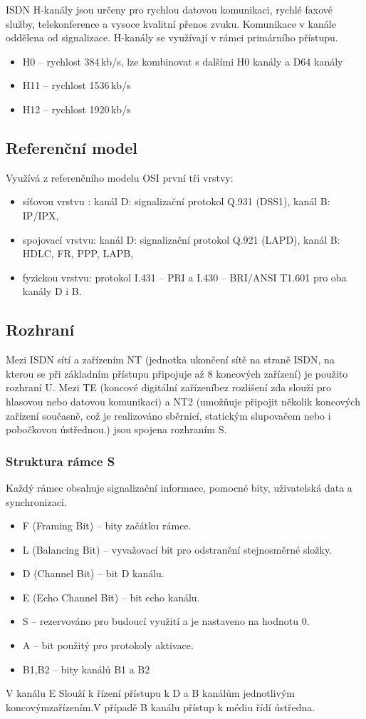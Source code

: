 ISDN H-kanály jsou určeny pro rychlou datovou komunikaci, rychlé faxové služby, telekonference a vysoce kvalitní přenos zvuku. Komunikace v kanále oddělena od signalizace. H-kanály se využívají v rámci primárního přístupu.
\begin{itemize}
    \item H0 -- rychlost 384\,kb/s, lze kombinovat s dalšími H0 kanály a D64 kanály
    \item H11 -- rychlost 1536\,kb/s
    \item H12 -- rychlost 1920\,kb/s
\end{itemize}

\subsection{Referenční model}
Využívá z referenčního modelu OSI první tři vrstvy:
\begin{itemize}
    \item síťovou vrstvu : kanál D: signalizační protokol Q.931 (DSS1), kanál B: IP/IPX,
    \item spojovací vrstvu: kanál D: signalizační protokol Q.921 (LAPD), kanál B: HDLC, FR, PPP, LAPB,
    \item fyzickou vrstvu: protokol I.431 – PRI a I.430 – BRI/ANSI T1.601 pro oba kanály D i B. 
\end{itemize}

\subsection{Rozhraní}
Mezi ISDN sítí a zařízením NT (jednotka ukončení sítě na straně ISDN, na kterou se při základním přístupu připojuje až 8 koncových
zařízení) je použito rozhraní U. Mezi TE (koncové digitální zařízeníbez rozlišení zda slouží pro hlasovou nebo datovou komunikaci) a NT2 (umožňuje připojit několik koncových zařízení současně, což je realizováno sběrnicí, statickým slupovačem nebo i pobočkovou ústřednou.) jsou spojena rozhraním S. 

\subsubsection{Struktura rámce S}
Každý rámec obsahuje signalizační informace, pomocné bity, uživatelská data a synchronizaci.
\begin{itemize}
    \item F (Framing Bit) – bity začátku rámce.
    \item L (Balancing Bit) – vyvažovací bit pro odstranění stejnosměrné složky.
    \item D (Channel Bit) – bit D kanálu.
    \item E (Echo Channel Bit) – bit echo kanálu.
    \item S – rezervováno pro budoucí využití a je nastaveno na hodnotu 0.
    \item A – bit použitý pro protokoly aktivace.
    \item B1,B2 – bity kanálů B1 a B2
\end{itemize}
V kanálu E Slouží k řízení přístupu k D a B kanálům jednotlivým koncovýmzařízením.V případě B kanálu přístup k médiu řídí ústředna. 

